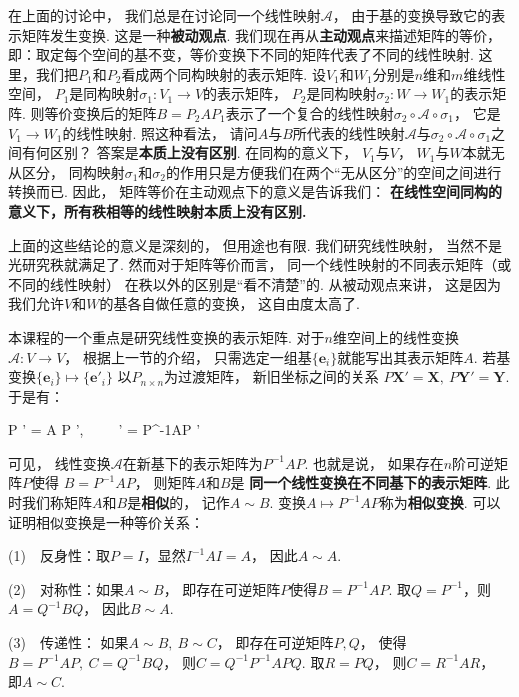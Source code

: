 在上面的讨论中，
我们总是在讨论同一个线性映射$\mathcal{A}$，
由于基的变换导致它的表示矩阵发生变换.
这是一种\textbf{被动观点}.
我们现在再从\textbf{主动观点}来描述矩阵的等价，
即：取定每个空间的基不变，等价变换下不同的矩阵代表了不同的线性映射.
这里，我们把$P_1$和$P_2$看成两个同构映射的表示矩阵.
设$V_1$和$W_1$分别是$n$维和$m$维线性空间，
$P_1$是同构映射$\sigma_1 : V_1 \to V$的表示矩阵，
$P_2$是同构映射$\sigma_2 : W \to W_1$的表示矩阵.
则等价变换后的矩阵$B = P_2 A P_1$表示了一个复合的线性映射$\sigma_2 \circ \mathcal{A} \circ \sigma_1$，
它是$ V_1 \to W_1$的线性映射.
照这种看法，
请问$A$与$B$所代表的线性映射$\mathcal{A}$与$\sigma_2 \circ \mathcal{A} \circ \sigma_1$之间有何区别？
答案是\textbf{本质上没有区别}.
在同构的意义下，
$V_1$与$V$，
$W_1$与$W$本就无从区分，
同构映射$\sigma_1$和$\sigma_2$的作用只是方便我们在两个“无从区分”的空间之间进行转换而已.
因此，
矩阵等价在主动观点下的意义是告诉我们：
\textbf{在线性空间同构的意义下，所有秩相等的线性映射本质上没有区别.}
\medskip

上面的这些结论的意义是深刻的，
但用途也有限.
我们研究线性映射，
当然不是光研究秩就满足了.
然而对于矩阵等价而言，
同一个线性映射的不同表示矩阵（或不同的线性映射）
在秩以外的区别是“看不清楚”的.
从被动观点来讲，
这是因为我们允许$V$和$W$的基各自做任意的变换，
这自由度太高了.

本课程的一个重点是研究线性变换的表示矩阵.
对于$n$维空间上的线性变换$\mathcal{A} : V \to V$，
根据上一节的介绍，
只需选定一组基$\{ \bm{e}_i \}$就能写出其表示矩阵$A$.
若基变换$\{ \bm{e}_i \} \mapsto \{ \bm{e}'_i \}$
以$P_{n \times n}$为过渡矩阵，
新旧坐标之间的关系
$P\bm{X}' = \bm{X}, ~ P\bm{Y}' = \bm{Y}$.
于是有：
\begin{eq1}
    P ' = A P ', ~~
    ~  ' = P^{-1}AP '
\end{eq1}

可见，
线性变换$\mathcal{A}$在新基下的表示矩阵为$P^{-1}AP$.
也就是说，
如果存在$n$阶可逆矩阵$P$使得
$B = P^{-1}AP$，
则矩阵$A$和$B$是
\textbf{同一个线性变换在不同基下的表示矩阵}.
此时我们称矩阵$A$和$B$是\textbf{相似}的，
记作$A \sim B$.
变换$A \mapsto P^{-1}AP$称为\textbf{相似变换}.
可以证明相似变换是一种等价关系：

\medskip




(1)~~反身性：取$P = I$，显然$I^{-1} A I = A$，
因此$A \sim A$.

(2)~~对称性：如果$A \sim B$，
即存在可逆矩阵$P$使得$B = P^{-1}AP$.
取$Q = P^{-1}$，则$A = Q^{-1}BQ$，
因此$B \sim A$.

(3)~~传递性：
如果$A \sim B , ~B \sim C$，
即存在可逆矩阵$P,Q$，
使得$B = P^{-1} A P, ~C = Q^{-1} B Q$，
则$C = Q^{-1} P^{-1} A PQ$.
取$R = PQ$，
则$C = R^{-1} A R$，
即$A \sim C$.
\medskip

